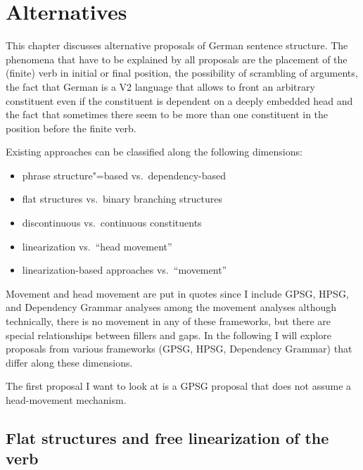 \chapter{Alternatives}
\label{chap-alternatives}%

\label{sec-local-frontings-alternatives}%

This chapter discusses alternative proposals of German sentence structure. The phenomena that have
to be explained by all proposals are the placement of the (finite) verb in initial or final
position, the possibility of scrambling of arguments, the fact that German is a V2 language that
allows to front an arbitrary constituent even if the constituent is dependent on a deeply embedded
head and the fact that sometimes there seem to be more than one constituent in the position before
the finite verb.

Existing approaches can be classified along the following dimensions:
\begin{itemize}
\item phrase structure"=based vs.\ dependency-based
\item flat structures vs.\ binary branching structures
\item discontinuous vs.\ continuous constituents
\item linearization vs.\ ``head movement''
\item linearization-based approaches vs.\ ``movement''
\end{itemize} 
Movement and head movement are put in quotes since I include GPSG, HPSG, and Dependency Grammar
analyses among the movement analyses although technically, there is no movement in any of these
frameworks, but there are special relationships between fillers and gaps. 
In the following I will explore proposals from various frameworks (GPSG, HPSG, Dependency Grammar)
that differ along these dimensions.

The first proposal I want to look at is a GPSG proposal that does not assume a head-movement
mechanism.


\section{Flat structures and free linearization of the verb}
\label{sec-flat-free-linearization-of-verb-gpsg}

